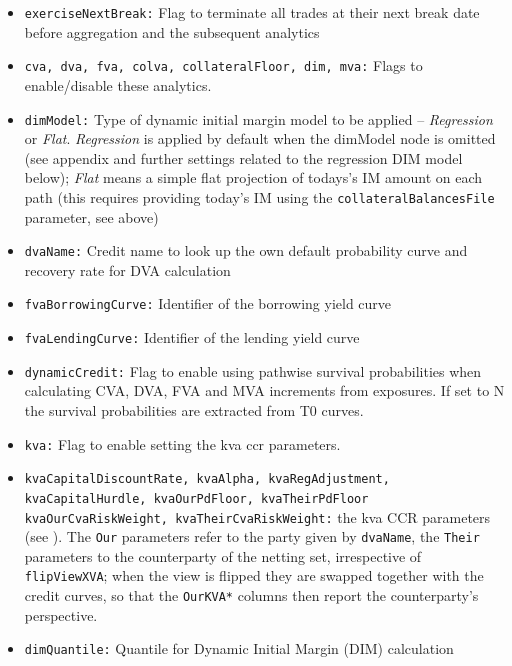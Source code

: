 \begin{itemize}
\item {\tt exerciseNextBreak:} Flag to terminate all trades at their next break date before aggregation and the
subsequent analytics
\item {\tt cva, dva, fva, colva, collateralFloor, dim, mva:} Flags to enable/disable these analytics. 
\item {\tt dimModel:} Type of dynamic initial margin model to be applied -- {\em Regression} or {\em Flat}. {\em Regression}
  is applied by default when the dimModel node is omitted (see appendix and further settings related to the regression DIM
  model below); {\em Flat} means a simple flat projection of todays's IM amount on each path (this requires providing
  today's IM using the {\tt collateralBalancesFile} parameter, see above)
\item {\tt dvaName:} Credit name to look up the own default probability curve and recovery rate for DVA calculation
\item {\tt fvaBorrowingCurve:} Identifier of the borrowing yield curve
\item {\tt fvaLendingCurve:} Identifier of the lending yield curve
\item {\tt dynamicCredit:} Flag to enable using pathwise survival probabilities when calculating CVA, DVA, FVA and MVA increments from exposures. If set to N the survival probabilities are extracted from T0 curves.
\item {\tt kva:} Flag to enable setting the kva ccr parameters.
\item {\tt kvaCapitalDiscountRate, kvaAlpha, kvaRegAdjustment, kvaCapitalHurdle, kvaOurPdFloor, kvaTheirPdFloor kvaOurCvaRiskWeight, kvaTheirCvaRiskWeight:} the kva CCR parameters (see \cite{methods}). The {\tt Our} parameters refer to the party given by {\tt dvaName}, the {\tt Their} parameters to the counterparty of the netting set, irrespective of {\tt flipViewXVA}; when the view is flipped they are swapped together with the credit curves, so that the {\tt OurKVA*} columns then report the counterparty's perspective.
\item {\tt dimQuantile:} Quantile for Dynamic Initial Margin (DIM) calculation

\end{itemize}
